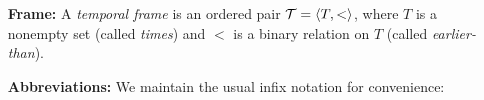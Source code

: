 \documentclass[a4paper, 11pt]{article} %
\begin{document}
\begin{enumerate}[leftmargin=1.2in] %
  \item[\bf Frame:] A \textit{temporal frame} is an ordered pair $\mathcal{T} = \langle T,<\rangle$, where $T$ is a nonempty set (called \textit{times}) and $<$ is a binary relation on $T$ (called \textit{earlier-than}).
  \item[\bf Abbreviations:] We maintain the usual infix notation for convenience:
    \begin{itemize}
\end{itemize}
\end{enumerate}
\end{document}
